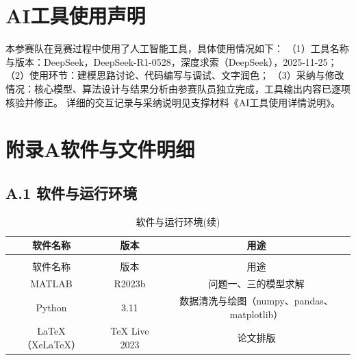 \documentclass{MathorCupmodeling}
\begin{document}
%
\section*{AI工具使用声明}
本参赛队在竞赛过程中使用了人工智能工具，具体使用情况如下：
（1）工具名称与版本：DeepSeek，DeepSeek-R1-0528，深度求索（DeepSeek），2025-11-25；
（2）使用环节：建模思路讨论、代码编写与调试、文字润色；
（3）采纳与修改情况：核心模型、算法设计与结果分析由参赛队员独立完成，工具输出内容已逐项核验并修正。
详细的交互记录与采纳说明见支撑材料《AI工具使用详情说明》。
%

\newpage
\section*{附录A软件与文件明细}

\subsection*{A.1 软件与运行环境}
\begin{longtable}{ccc}
	\caption{软件与运行环境}
	\label{tab:software}\\
	\toprule[1.5pt]
	软件名称 & 版本 & 用途 \\
	\midrule
	\endfirsthead
	\caption[]{软件与运行环境(续)}\\
	\toprule[1.5pt]
	软件名称 & 版本 & 用途 \\
	\midrule
	\endhead
	\bottomrule[1.5pt]
	\endfoot
	MATLAB & R2023b & 问题一、三的模型求解 \\
	Python & 3.11 & 数据清洗与绘图（numpy、pandas、matplotlib） \\
	\LaTeX{}（XeLaTeX） & TeX Live 2023 & 论文排版 \\
\end{longtable}
\end{document}
